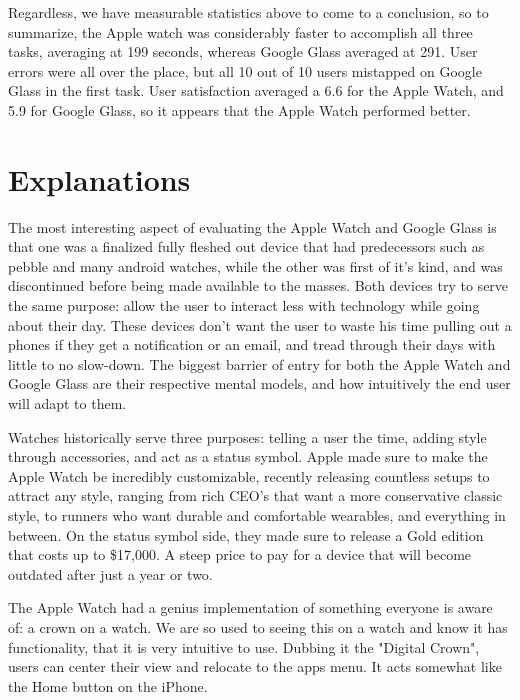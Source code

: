 \documentclass[paper=a4, fontsize=11pt]{scrartcl}	%
\numberwithin{equation}{section}															%
\numberwithin{figure}{section}																%
\numberwithin{table}{section}																%
\begin{document}
Regardless, we have measurable statistics above to come to a conclusion, so to summarize, the Apple watch was considerably faster to accomplish all three tasks, averaging at 199 seconds, whereas Google Glass averaged at 291. User errors were all over the place, but all 10 out of 10 users mistapped on Google Glass in the first task. User satisfaction averaged a 6.6 for the Apple Watch, and 5.9 for Google Glass, so it appears that the Apple Watch performed better. 



\section{Explanations}
The most interesting aspect of evaluating the Apple Watch and Google Glass is that one was a finalized fully fleshed out device that had predecessors such as pebble and many android watches, while the other was first of it's kind, and was discontinued before being made available to the masses. Both devices try to serve the same purpose: allow the user to interact less with technology while going about their day. These devices don't want the user  to waste his time pulling out a phones if they get a notification or an email, and tread through their days with little to no slow-down. The biggest barrier of entry for both the Apple Watch and Google Glass are their respective mental models, and how intuitively the end user will adapt to them. \par

Watches historically serve three purposes: telling a user the time, adding style through accessories, and act as a status symbol. Apple made sure to make the Apple Watch be incredibly customizable, recently releasing countless setups to attract any style, ranging from rich CEO's that want a more conservative classic style, to runners who want durable and comfortable wearables, and everything in between. On the status symbol side, they made sure to release a Gold edition that costs up to  \$17,000. A steep price to pay for a device that will become outdated after just a year or two.\par

The Apple Watch had a genius implementation of something everyone is aware of: a crown on a watch. We are so used to seeing this on a watch and know it has functionality, that it is very intuitive to use. Dubbing it the "Digital Crown", users can center their view and relocate to the apps menu. It acts somewhat like the Home button on the iPhone.
\end{document}
